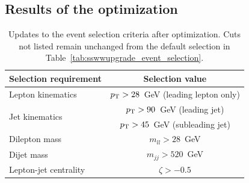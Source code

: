 %
\subsection{Results of the optimization}\label{sswwupgrade:opt_results}



\begin{table}[htb]
  \centering
  \begin{tabular}{l|c}
    Selection requirement              & Selection value \\
    \hline\hline
    Lepton kinematics                  & $p_{\mathrm{T}} > 28$~GeV (leading lepton only) \\
    \multirow{2}{*}{Jet kinematics}    & $p_{\mathrm{T}} > 90$~GeV (leading jet) \\
                                       & $p_{\mathrm{T}} > 45$~GeV (subleading jet) \\
    \hline
    Dilepton mass                      & $m_{ll} > 28$~GeV \\
    Dijet mass                         & $m_{jj} > 520$~GeV \\
    Lepton-jet centrality              & $\zeta > -0.5$ \\
    \hline
  \end{tabular}
  \caption{Updates to the \ssww event selection criteria after optimization.  Cuts not listed remain unchanged from the default selection in Table~\ref{tab:sswwupgrade_event_selection}.}
  \label{tab:sswwupgrade_optimized_selection}
\end{table}

